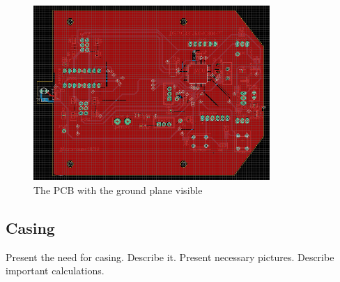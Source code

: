 \begin{figure}[htb]
    \centering
    \includegraphics[width=0.8\textwidth]{figures/hardware/PCB_Grounded.PNG}
    \caption{The PCB with the ground plane visible}
    \label{fig:gnd}
\end{figure}

\FloatBarrier

\subsection{Casing}

Present the need for casing.
Describe it.
Present necessary pictures.
Describe important calculations.







